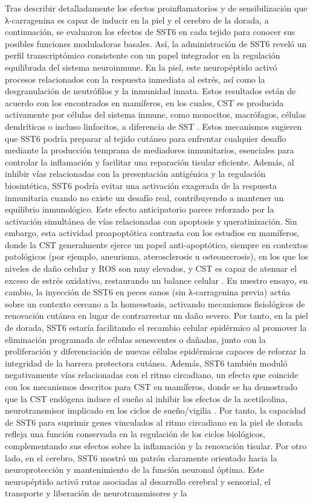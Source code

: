 \documentclass[10pt,a4paper]{article}
\begin{document}
Tras describir detalladamente los efectos proinflamatorios y de sensibilización que λ-carragenina es capaz de inducir en la piel y el cerebro de la dorada, a continuación, se evaluaron los efectos de SST6 en cada tejido para conocer sus posibles funciones moduladoras basales. Así, la administración de SST6 reveló un perfil transcriptómico consistente con un papel integrador en la regulación equilibrada del sistema neuroinmune. En la piel, este neuropéptido activó procesos relacionados con la respuesta inmediata al estrés, así como la desgranulación de neutrófilos y la inmunidad innata. Estos resultados están de acuerdo con los encontrados en mamíferos, en los cuales, CST es producida activamente por células del sistema inmune, como monocitos, macrófagos, células dendríticas o incluso linfocitos, a diferencia de SST \parencite{Dalm2003}. Estos mecanismos sugieren que SST6 podría preparar al tejido cutáneo para enfrentar cualquier desafío mediante la producción temprana de mediadores inmunitarios, esenciales para controlar la inflamación y facilitar una reparación tisular eficiente. Además, al inhibir vías relacionadas con la presentación antigénica y la regulación biosintética, SST6 podría evitar una activación exagerada de la respuesta inmunitaria cuando no existe un desafío real, contribuyendo a mantener un equilibrio inmunológico. Este efecto anticipatorio parece reforzado por la activación simultánea de vías relacionadas con apoptosis y queratinización. Sin embargo, esta actividad proapoptótica contrasta con los estudios en mamíferos, donde la CST generalmente ejerce un papel anti-apoptótico, siempre en contextos patológicos (por ejemplo, aneurisma, aterosclerosis u osteonecrosis), en los que los niveles de daño celular y ROS son muy elevados, y CST es capaz de atenuar el exceso de estrés oxidativo, restaurando un balance celular \parencite{Chen2022b,DelgadoMaroto2017b,Gao2024}. En nuestro ensayo, en cambio, la inyección de SST6 en peces sanos (sin λ-carragenina previa) actúa sobre un contexto cercano a la homeostasis, activando mecanismos fisiológicos de renovación cutánea en lugar de contrarrestar un daño severo. Por tanto, en la piel de dorada, SST6 estaría facilitando el recambio celular epidérmico al promover la eliminación programada de células senescentes o dañadas, junto con la proliferación y diferenciación de nuevas células epidérmicas capaces de reforzar la integridad de la barrera protectora cutánea. Además, SST6 también moduló negativamente vías relacionadas con el ritmo circadiano, un efecto que coincide con los mecanismos descritos para CST en mamíferos, donde se ha demostrado que la CST endógena induce el sueño al inhibir los efectos de la acetilcolina, neurotransmisor implicado en los ciclos de sueño/vigilia \parencite{Spier2000}. Por tanto, la capacidad de SST6 para suprimir genes vinculados al ritmo circadiano en la piel de dorada refleja una función conservada en la regulación de los ciclos biológicos, complementando sus efectos sobre la inflamación y la renovación tisular. Por otro lado, en el cerebro, SST6 mostró un patrón claramente orientado hacia la neuroprotección y mantenimiento de la función neuronal óptima. Este neuropéptido activó rutas asociadas al desarrollo cerebral y sensorial, el transporte y liberación de neurotransmisores y la 
\end{document}
